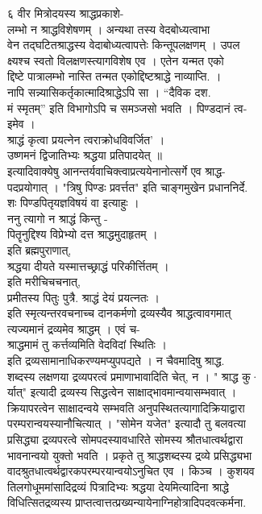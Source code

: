 \documentclass[11pt, openany]{book}
\begin{document}
{{{{{{{{{{{{{{{{{{६ }{ वीर}{ }{मित्रोदयस्य श्राद्धप्रकाशे-}{\\
लम्भो न श्राद्धविशेषणम् । अन्यथा तस्य वेदबोध्यत्वाभा\\
वेन तद्घटितश्राद्धस्य वेदाबोध्यत्वापत्तेः किन्तूपलक्षणम् । उपल\\
क्ष्यश्च स्वतो विलक्षणस्त्यागविशेष एव । एतेन यन्मत एको\\
द्दिष्टे पात्रालम्भो नास्ति तन्मत एकोद्दिष्टश्राद्धे नाव्याप्ति. ।\\
नापि सन्न्यासिकर्तृकात्मादिश्राद्धेऽपि सा । ``दैविक दश.\\
मं स्मृतम्'' इति विभागोऽपि च समञ्जसो भवति । पिण्डदानं त्व-\\
इमेव ।\\
श्राद्धं कृत्वा प्रयत्नेन त्वराक्रोधविवर्जित' ।\\
उष्णमनं द्विजातिभ्यः श्रद्धया प्रतिपादयेत् ॥\\
इत्यादिवाक्येषु आनन्तर्यवाचिक्त्वाप्रत्ययेनानोत्सर्गे एव श्राद्ध-\\
पदप्रयोगात् । "त्रिषु पिण्डः प्रवर्त्तत" इति चाङ्गमुखेन प्रधाननिर्दे.\\
शः पिण्डपितृयज्ञविषयं वा इत्याहुः ।\\
ननु त्यागो न श्राद्धं किन्तु -\\
पितॄनुद्दिश्य विप्रेभ्यो दत्त श्राद्धमुदाहृतम् ।\\
इति ब्रह्मपुराणात्,\\
श्रद्धया }{दीयते}{ यस्मात्तच्छ्राद्धं परिकीर्त्तितम् ।\\
इति मरीचिचचनात्,\\
प्रमीतस्य पितुः पुत्रै. श्राद्धं देयं प्रयत्नतः ।\\
इति स्मृत्यन्तरवचनाच्च दानकर्मणो द्रव्यस्यैव श्राद्धत्वावगमात्\\
त्यज्यमानं द्रव्यमेव श्राद्धम् । एवं च-\\
श्राद्धमामं तु कर्त्तव्यमिति वेदविदां स्थितिः ।\\
इति द्रव्यसामानाधिकरण्यमप्युपपद्यते । न चैवमादिषु श्राद्ध.\\
शब्दस्य लक्षणया द्रव्यपरत्वं प्रमाणाभावादिति चेत्, न । " श्राद्ध कु·\\
र्यात्" इत्यादी द्रव्यस्य सिद्धत्वेन साक्षाद्भावमान्वयासम्भवात् ।\\
क्रियापरत्वेन साक्षादन्वये सम्भवति अनुपस्थितत्यागादिक्रियाद्वारा\\
परम्परान्वयस्यानौचित्यात् । "सोमेन यजेत" इत्यादौ तु बलवत्या\\
प्रसिद्ध्या द्रव्यपरत्वे सोमपदस्यावधारिते सोमस्य श्रौतधात्वर्थद्वारा\\
भावनान्वयो युक्तो भवति । प्रकृते तु श्राद्धशब्दस्य द्रव्ये
प्रसिद्ध्यभा\\
वादश्रुतधात्वर्थद्वारकपरम्परयान्वयोऽनुचित एव । किञ्च । कुशयव\\
तिलगोधूममांसादिद्रव्यं पित्रादिभ्यः श्रद्धया देयमित्यादिना श्राद्धे\\
विधित्सितद्रव्यस्य
प्राप्तत्वात्तत्प्रख्यन्यायेनाग्निहोत्रादिपदवत्कर्मना.\\


}}}}}}}}}}}}}}}}}}
\end{document}
